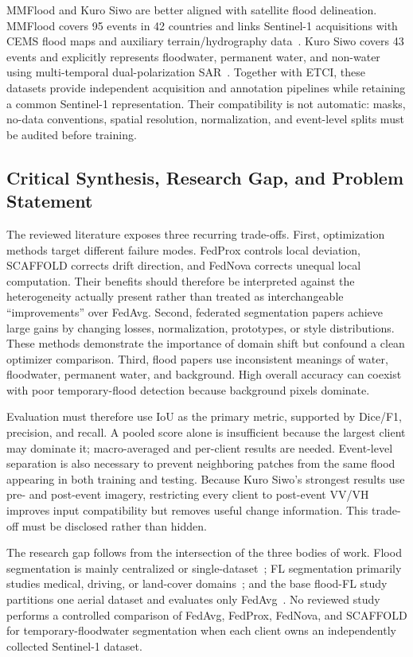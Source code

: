 \documentclass[conference]{IEEEtran}
\begin{document}
MMFlood and Kuro Siwo are better aligned with satellite flood delineation. MMFlood covers 95 events in 42 countries and links Sentinel-1 acquisitions with CEMS flood maps and auxiliary terrain/hydrography data~\cite{montello2022mmflood}. Kuro Siwo covers 43 events and explicitly represents floodwater, permanent water, and non-water using multi-temporal dual-polarization SAR~\cite{bountos2024kuro}. Together with ETCI, these datasets provide independent acquisition and annotation pipelines while retaining a common Sentinel-1 representation. Their compatibility is not automatic: masks, no-data conventions, spatial resolution, normalization, and event-level splits must be audited before training.

\subsection{Critical Synthesis, Research Gap, and Problem Statement}
The reviewed literature exposes three recurring trade-offs. First, optimization methods target different failure modes. FedProx controls local deviation, SCAFFOLD corrects drift direction, and FedNova corrects unequal local computation. Their benefits should therefore be interpreted against the heterogeneity actually present rather than treated as interchangeable ``improvements'' over FedAvg. Second, federated segmentation papers achieve large gains by changing losses, normalization, prototypes, or style distributions. These methods demonstrate the importance of domain shift but confound a clean optimizer comparison. Third, flood papers use inconsistent meanings of water, floodwater, permanent water, and background. High overall accuracy can coexist with poor temporary-flood detection because background pixels dominate.

Evaluation must therefore use IoU as the primary metric, supported by Dice/F1, precision, and recall. A pooled score alone is insufficient because the largest client may dominate it; macro-averaged and per-client results are needed. Event-level separation is also necessary to prevent neighboring patches from the same flood appearing in both training and testing. Because Kuro Siwo's strongest results use pre- and post-event imagery, restricting every client to post-event VV/VH improves input compatibility but removes useful change information. This trade-off must be disclosed rather than hidden.

The research gap follows from the intersection of the three bodies of work. Flood segmentation is mainly centralized or single-dataset~\cite{paul2021flood, bai2021enhancement, pechmay2024segmentation, portalesjulia2025understanding}; FL segmentation primarily studies medical, driving, or land-cover domains~\cite{liu2021feddg, fantauzzo2022feddrive, tan2024bridging}; and the base flood-FL study partitions one aerial dataset and evaluates only FedAvg~\cite{islam2025robust}. No reviewed study performs a controlled comparison of FedAvg, FedProx, FedNova, and SCAFFOLD for temporary-floodwater segmentation when each client owns an independently collected Sentinel-1 dataset.
\end{document}
